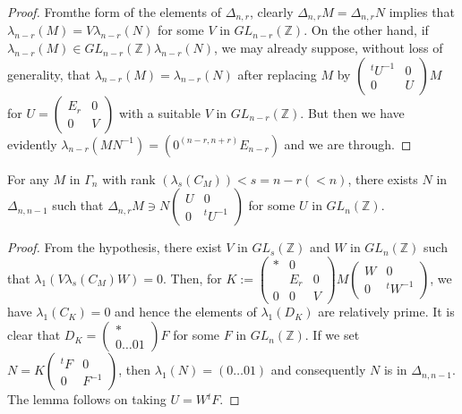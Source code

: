 \begin{proof}
From\pageoriginale the form of the elements of $\Delta_{n,r}$, clearly
$\Delta_{n,r}M=\Delta_{n,r}N$ implies that
$\lambda_{n-r}(M)=V\lambda_{n-r}(N)$ for some $V$ in
$GL_{n-r}(\mathbb{Z})$. On the other hand, if $\lambda_{n-r}(M)\in
GL_{n-r}(\mathbb{Z})\lambda_{n-r}(N)$, we may already suppose, without
loss of generality, that $\lambda_{n-r}(M)=\lambda_{n-r}(N)$ after
replacing $M$ by $\left(\begin{smallmatrix} {}^{t}U^{-1} & 0\\ 0 & U
\end{smallmatrix}\right)M$ for $U=\left(\begin{smallmatrix} E_{r} &
  0\\ 0 & V\end{smallmatrix}\right)$ with a suitable $V$ in
  $GL_{n-r}(\mathbb{Z})$. But then we have evidently
  $\lambda_{n-r}(MN^{-1})=(0^{(n-r,n+r)}E_{n-r})$ and we are through.
\end{proof}

\begin{sublemma}\label{c1:lem-1.6.11}
For any $M$ in $\Gamma_{n}$ with rank
$(\lambda_{s}(C_{M}))<s=n-r(<n)$, there exists $N$ in $\Delta_{n,n-1}$
such that $\Delta_{n,r}M\ni N\left(\begin{smallmatrix} U & 0\\ 0 &
  {}^{t}U^{-1}\end{smallmatrix}\right)$ for some $U$ in $GL_{n}(\mathbb{Z})$.
\end{sublemma}

\begin{proof}
From the hypothesis, there exist $V$ in $GL_{s}(\mathbb{Z})$ and $W$
in $GL_{n}(\mathbb{Z})$ such that
$\lambda_{1}(V\lambda_{s}(C_{M})W)=0$. Then, for
$K:=\left(\begin{smallmatrix} \ast & 0 & \\ & E_{r} & 0\\ 0 & 0 & V
\end{smallmatrix}\right)M\left(\begin{smallmatrix} W & 0\\ 0 &
  {}^{t}W^{-1}
\end{smallmatrix}\right)$, we have $\lambda_{1}(C_{K})=0$ and hence
the elements of $\lambda_{1}(D_{K})$ are relatively prime. It is clear
that $D_{K}=\left(\begin{smallmatrix} \ast \\ 0\ldots 01
\end{smallmatrix}\right)F$ for some $F$ in $GL_{n}(\mathbb{Z})$. If we
set $N=K\left(\begin{smallmatrix} {}^{t}F & 0\\ 0 & F^{-1}
\end{smallmatrix}\right)$, then $\lambda_{1}(N)=(0\ldots 01)$ and
consequently $N$ is in $\Delta_{n,n-1}$. The lemma follows on taking
$U=W{}^{t}F$. 
\end{proof}

